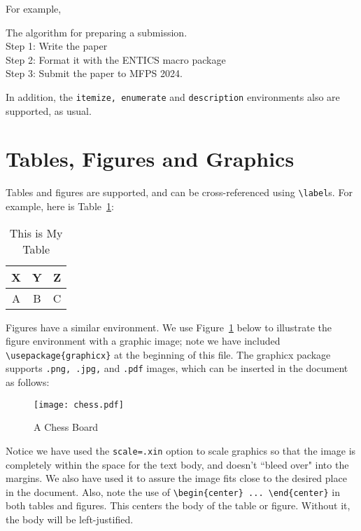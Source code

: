 \documentclass[twoside,11pt]{entics}
\def\conf{MFPS 2024} 	%
\begin{document}
For example,

\begin{algorithm}[h]
  \begin{alg} The algorithm for preparing a submission.\\
    Step 1:  Write the paper\\
    Step 2: Format it with the ENTICS macro package\\
    Step 3:  Submit the paper to \conf. \\
  \end{alg}
\end{algorithm}

In addition, the \verb+itemize, enumerate+ and \verb+description+ environments
also are supported, as usual.

\section{Tables, Figures and Graphics}

Tables and figures are supported, and can be cross-referenced using
\verb+\label+s. For example, here is Table~\ref{mytable}:

\begin{table}[htp]
  \caption{This is My Table}
  \begin{center}
    \begin{tabular}{|c|c|c|}
      \hline X & Y & Z \\
      \hline
      A        & B & C \\
      \hline
    \end{tabular}\label{mytable}
  \end{center}
\end{table}

Figures have a similar environment. We use Figure~\ref{myfigure} below to
illustrate the figure environment with a graphic image; note we have included
\verb+\usepackage{graphicx}+ at the beginning of this file. The graphicx
package supports \verb+.png, .jpg,+ and \verb+.pdf+ images, which can be
inserted in the document as follows:

\begin{figure}[h!]
  \begin{center}
    \texttt{[image: chess.pdf]}
    \caption{A Chess Board}\label{myfigure}
  \end{center}
\end{figure}
Notice we have used the \verb+scale=.xin+ option to scale graphics so that the image is completely within the space for the text body, and doesn't ``bleed over" into the margins. We also have used it to assure the image fits close to the desired place in the document. Also, note the use of \verb+\begin{center} ... \end{center}+ in both tables and figures. This centers the body of the table or figure. Without it, the body will be left-justified.
\end{document}
